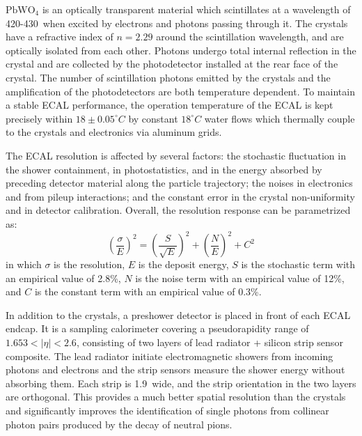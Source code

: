 $\text{PbWO}_{4}$ is an optically transparent material which scintillates at a wavelength of 420-430~\nm when excited by electrons and photons passing through it.
The crystals have a refractive index of $n = 2.29$ around the scintillation wavelength, and are optically isolated from each other.
Photons undergo total internal reflection in the crystal and are collected by the photodetector installed at the rear face of the crystal.  
The number of scintillation photons emitted by the crystals and the amplification of the photodetectors are both temperature dependent.
To maintain a stable ECAL performance, the operation temperature of the ECAL is kept precisely within $18 \pm 0.05^{\circ}C$
by constant $18^{\circ}C$ water flows which thermally couple to the crystals and electronics via aluminum grids.

The ECAL resolution is affected by several factors: 
the stochastic fluctuation in the shower containment, in photostatistics, and in the energy absorbed by preceding detector material along the particle trajectory; 
the noises in electronics and from pileup interactions;
and the constant error in the crystal non-uniformity and in detector calibration.
Overall, the resolution response can be parametrized as:
\begin{equation}\label{eq:ecal_reso}
    ( \frac{\sigma}{E} )^{2} = ( \frac{S}{\sqrt{E}} )^{2} + ( \frac{N}{E} )^{2} + C^{2}
\end{equation}
in which $\sigma$ is the resolution, $E$ is the deposit energy,
$S$ is the stochastic term with an empirical value of 2.8\%, 
$N$ is the noise term with an empirical value of 12\%,
and $C$ is the constant term with an empirical value of 0.3\%.

In addition to the crystals, a preshower detector is placed in front of each ECAL endcap. 
It is a sampling calorimeter covering a pseudorapidity range of $1.653 < |\eta| < 2.6$, 
consisting of two layers of lead radiator + silicon strip sensor composite. 
The lead radiator initiate electromagnetic showers from incoming photons and electrons and the strip sensors measure the shower energy without absorbing them.
Each strip is 1.9~\mm wide, and the strip orientation in the two layers are orthogonal.
This provides a much better spatial resolution than the crystals and significantly improves the 
identification of single photons from collinear photon pairs produced by the decay of neutral pions.



